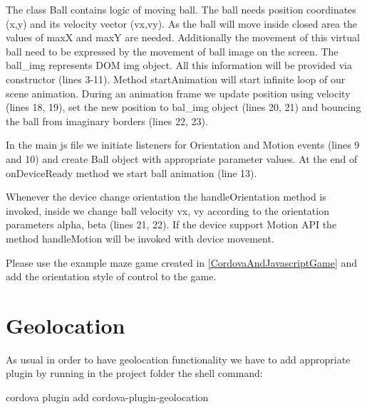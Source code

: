 
\begin{explain}
The class Ball contains logic of moving ball. The ball needs position coordinates (x,y) and its velocity vector (vx,vy). As the ball will move inside closed area the values of maxX and maxY are needed. Additionally the movement of this virtual ball need to be expressed by the movement of ball image on the screen. The ball\_img represents DOM img object. All this information will be provided via constructor (lines 3-11). Method startAnimation will start infinite loop of our scene animation. During an animation frame we update position using velocity (lines 18, 19), set the new position to bal\_img object (lines 20, 21) and bouncing the ball from imaginary borders (lines 22, 23).
\end{explain}


\begin{explain}
 In the main js file we initiate listeners for Orientation and Motion events (lines 9 and 10) and create Ball object with appropriate parameter values. At the end of onDeviceReady method we start ball animation (line 13).

Whenever the device change orientation the handleOrientation method is invoked, inside we change ball velocity vx, vy according to the orientation parameters alpha, beta (lines 21, 22). If the device support Motion API the method handleMotion will be invoked with device movement.
\end{explain}

\begin{extercises}
Please use the example maze game created in \ref{CordovaAndJavascriptGame} and add the orientation style of control to the game.
\end{extercises}

\section{Geolocation}

As usual in order to have geolocation functionality we have to add appropriate plugin by running in the project folder the shell command:

\begin{shell}
cordova plugin add cordova-plugin-geolocation
\end{shell}

